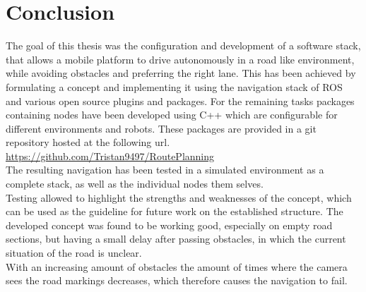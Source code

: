 \chapter{Conclusion}
\label{Conclusion}
The goal of this thesis was the configuration and development of a software stack, that allows a mobile platform to drive autonomously in a road like environment, while avoiding obstacles and preferring the right lane.
This has been achieved by formulating a concept and implementing it using the navigation stack of ROS and various open source plugins and packages.
For the remaining tasks packages containing nodes have been developed using C++ which are configurable for different environments and robots. These packages are provided in a git repository hosted at the following url.\\

\url{https://github.com/Tristan9497/RoutePlanning}\\

The resulting navigation has been tested in a simulated environment as a complete stack, as well as the individual nodes them selves.\\

Testing allowed to highlight the strengths and weaknesses of the concept, which can be used as the guideline for future work on the established structure. The developed concept was found to be working good, especially on empty road sections, but having a small delay after passing obstacles, in which the current situation of the road is unclear.\\

With an increasing amount of obstacles the amount of times where the camera sees the road markings decreases, which therefore causes the navigation to fail.
